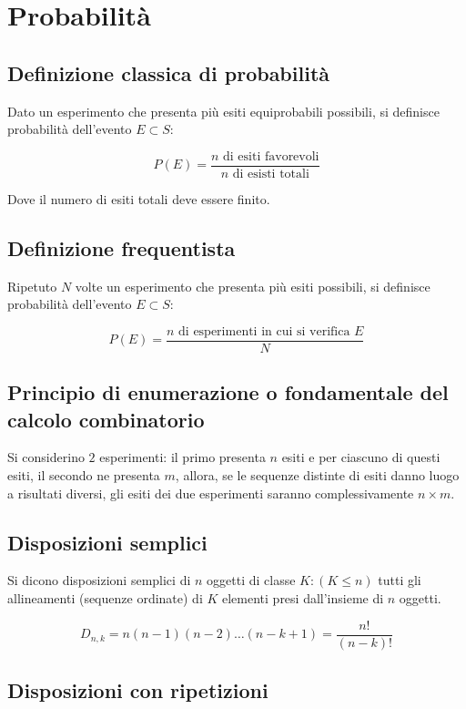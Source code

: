 \documentclass{subfiles}
\begin{document}
\section{Probabilità}

\subsection{Definizione classica di probabilità}

Dato un esperimento che presenta più esiti equiprobabili possibili, si definisce probabilità dell'evento $E \subset S$:

$$
P(E) = \frac{n \text{ di esiti favorevoli}}{n \text{ di esisti totali}}
$$

\noindent
Dove il numero di esiti totali deve essere finito.

\subsection{Definizione frequentista}

Ripetuto $N$ volte un esperimento che presenta più esiti possibili, si definisce probabilità dell'evento $E \subset S$:

$$
P(E) = \frac{n \text{ di esperimenti in cui si verifica } E}{N}
$$

\subsection{Principio di enumerazione o fondamentale del calcolo combinatorio}

Si considerino $2$ esperimenti:
il primo presenta $n$ esiti e per ciascuno di questi esiti,
il secondo ne presenta $m$, allora, se le sequenze distinte di esiti danno luogo a risultati diversi,
gli esiti dei due esperimenti saranno complessivamente $n \times m$.

\subsection{Disposizioni semplici}

Si dicono disposizioni semplici di $n$ oggetti di classe $K : (K \leq n)$ tutti gli allineamenti (sequenze ordinate) di $K$ elementi presi dall'insieme di $n$ oggetti.

$$
D_{n,k} = n(n-1)(n-2)\dots(n-k+1)=\frac{n!}{(n-k)!}
$$

\subsection{Disposizioni con ripetizioni}
\end{document}
